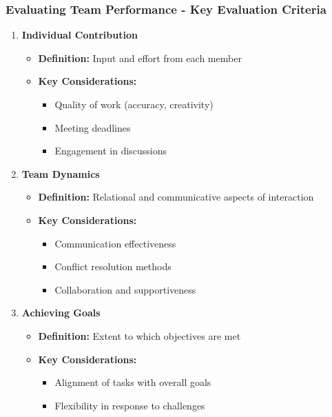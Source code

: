 \documentclass[aspectratio=169]{beamer}
\begin{document}
\begin{frame}[fragile]
    \frametitle{Evaluating Team Performance - Key Evaluation Criteria}
    \begin{enumerate}
        \item \textbf{Individual Contribution}
            \begin{itemize}
                \item \textbf{Definition:} Input and effort from each member
                \item \textbf{Key Considerations:}
                    \begin{itemize}
                        \item Quality of work (accuracy, creativity)
                        \item Meeting deadlines
                        \item Engagement in discussions
                    \end{itemize}
            \end{itemize}
        \item \textbf{Team Dynamics}
            \begin{itemize}
                \item \textbf{Definition:} Relational and communicative aspects of interaction
                \item \textbf{Key Considerations:}
                    \begin{itemize}
                        \item Communication effectiveness
                        \item Conflict resolution methods
                        \item Collaboration and supportiveness
                    \end{itemize}
            \end{itemize}
        \item \textbf{Achieving Goals}
            \begin{itemize}
                \item \textbf{Definition:} Extent to which objectives are met
                \item \textbf{Key Considerations:}
                    \begin{itemize}
                        \item Alignment of tasks with overall goals
                        \item Flexibility in response to challenges
                    \end{itemize}
            \end{itemize}
    \end{enumerate}
\end{frame}
\end{document}
